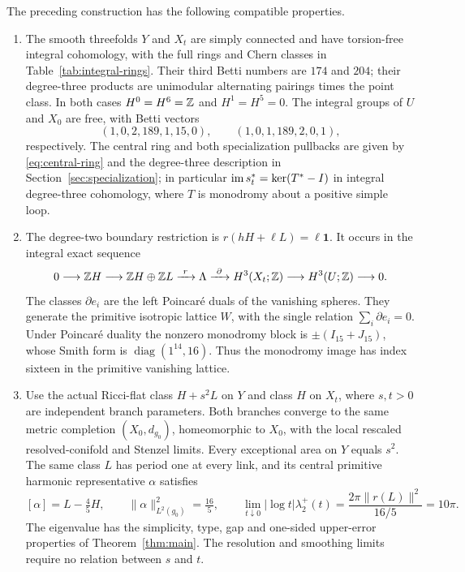 \begin{theorem}\label{thm:integrated}
The preceding construction has the following compatible properties.
\begin{enumerate}
\item The smooth threefolds $Y$ and $X_t$ are simply connected and
have torsion-free integral cohomology, with the full rings and Chern
classes in Table~\ref{tab:integral-rings}. Their third Betti numbers
are $174$ and $204$; their degree-three products are unimodular
alternating pairings times the point class. In both cases
$H^0=H^6=\mathbb Z$ and $H^1=H^5=0$. The integral groups of $U$ and $X_0$ are free,
with Betti vectors
\[
 (1,0,2,189,1,15,0),\qquad (1,0,1,189,2,0,1),
\]
respectively. The central ring and both specialization pullbacks are
given by \eqref{eq:central-ring} and the degree-three description in
Section~\ref{sec:specialization}; in particular
$\operatorname{im} s_t^*=\ker(T^*-I)$ in integral degree-three cohomology,
where $T$ is monodromy about a positive simple loop.

\item The degree-two boundary restriction is
$r(hH+\ell L)=\ell\mathbf1$. It occurs in the integral exact sequence
\begin{equation}\label{eq:split-exact-sequence}
 0\longrightarrow\mathbb Z H\longrightarrow\mathbb Z H\oplus\mathbb Z L
 \xrightarrow{\ r\ }\Lambda\xrightarrow{\ \partial\ }
 H^3(X_t;\mathbb Z)\longrightarrow H^3(U;\mathbb Z)\longrightarrow0.
\end{equation}
The classes $\partial e_i$ are the left Poincar\'e duals of the
vanishing spheres. They generate the primitive isotropic lattice $W$,
with the single relation $\sum_i\partial e_i=0$. Under Poincar\'e
duality the nonzero monodromy block is $\pm(I_{15}+J_{15})$, whose
Smith form is $\operatorname{diag}(1^{14},16)$. Thus the monodromy
image has index sixteen in the primitive vanishing lattice.

\item Use the actual Ricci-flat class $H+s^2L$ on $Y$ and class $H$
on $X_t$, where $s,t>0$ are independent branch parameters. Both
branches converge to the same metric completion $(X_0,d_{g_0})$,
homeomorphic to $X_0$, with the local rescaled resolved-conifold and
Stenzel limits. Every exceptional area on $Y$ equals $s^2$.
The same class $L$ has period one at every link, and its central
primitive harmonic representative $\alpha$ satisfies
\begin{equation}\label{eq:split-compatibility}
 [\alpha]=L-\tfrac45H,\qquad
 \|\alpha\|_{L^2(g_0)}^2=\tfrac{16}{5},\qquad
 \lim_{t\downarrow0}|\log t|\lambda_2^+(t)
 =\frac{2\pi\|r(L)\|^2}{16/5}=10\pi.
\end{equation}
The eigenvalue has the simplicity, type, gap and one-sided upper-error
properties of Theorem~\ref{thm:main}. The resolution and smoothing
limits require no relation between $s$ and $t$.


\end{enumerate}
\end{theorem}
